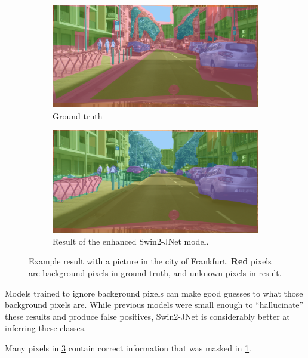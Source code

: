 \begin{figure}[h]
	\begin{subfigure}{.5\textwidth}
		\includegraphics[width=\textwidth]{city_images/swin2_no_background_gt_pic.png}
		\caption{Ground truth}
		\label{swin2_gt_image}
	\end{subfigure}
	\begin{subfigure}{.5\textwidth}
		\includegraphics[width=\textwidth]{city_images/swin2_no_background_pic.png}
		\caption{Result of the enhanced Swin2-JNet model.}
		\label{swin2_result_image}
	\end{subfigure}
	\caption{Example result with a picture in the city of Frankfurt. \textbf{\textcolor{BrickRed}{Red}} pixels are background pixels in ground truth, and unknown pixels in result.}
\end{figure}

Models trained to ignore background pixels can make good guesses to what those background pixels are.
While previous models were small enough to ``hallucinate'' these results and produce false positives, Swin2-JNet is considerably better at inferring these classes.

Many pixels in \cref{swin2_result_image} contain correct information that was masked in \cref{swin2_gt_image}.

